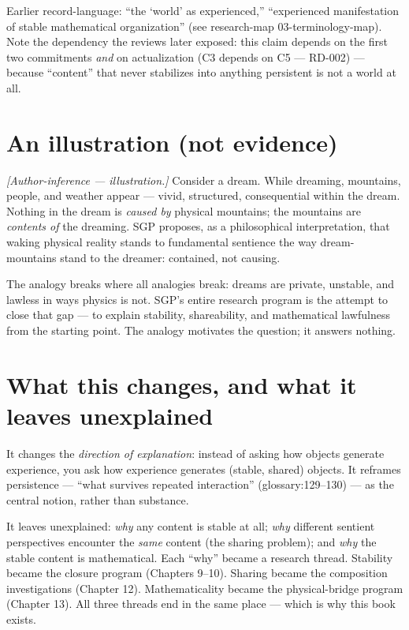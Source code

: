 \documentclass[
  11pt,
]{book}
\begin{document}
Earlier record-language: ``the `world' as experienced,'' ``experienced
manifestation of stable mathematical organization'' (see research-map
03-terminology-map). Note the dependency the reviews later exposed: this
claim depends on the first two commitments \emph{and} on actualization
(C3 depends on C5 --- RD-002) --- because ``content'' that never
stabilizes into anything persistent is not a world at all.

\section{An illustration (not
evidence)}\label{an-illustration-not-evidence}

\emph{{[}Author-inference --- illustration.{]}} Consider a dream. While
dreaming, mountains, people, and weather appear --- vivid, structured,
consequential within the dream. Nothing in the dream is \emph{caused by}
physical mountains; the mountains are \emph{contents of} the dreaming.
SGP proposes, as a philosophical interpretation, that waking physical
reality stands to fundamental sentience the way dream-mountains stand to
the dreamer: contained, not causing.

The analogy breaks where all analogies break: dreams are private,
unstable, and lawless in ways physics is not. SGP's entire research
program is the attempt to close that gap --- to explain stability,
shareability, and mathematical lawfulness from the starting point. The
analogy motivates the question; it answers nothing.

\section{What this changes, and what it leaves
unexplained}\label{what-this-changes-and-what-it-leaves-unexplained}

It changes the \emph{direction of explanation}: instead of asking how
objects generate experience, you ask how experience generates (stable,
shared) objects. It reframes persistence --- ``what survives repeated
interaction'' (glossary:129--130) --- as the central notion, rather than
substance.

It leaves unexplained: \emph{why} any content is stable at all;
\emph{why} different sentient perspectives encounter the \emph{same}
content (the sharing problem); and \emph{why} the stable content is
mathematical. Each ``why'' became a research thread. Stability became
the closure program (Chapters 9--10). Sharing became the composition
investigations (Chapter 12). Mathematicality became the physical-bridge
program (Chapter 13). All three threads end in the same place --- which
is why this book exists.
\end{document}
